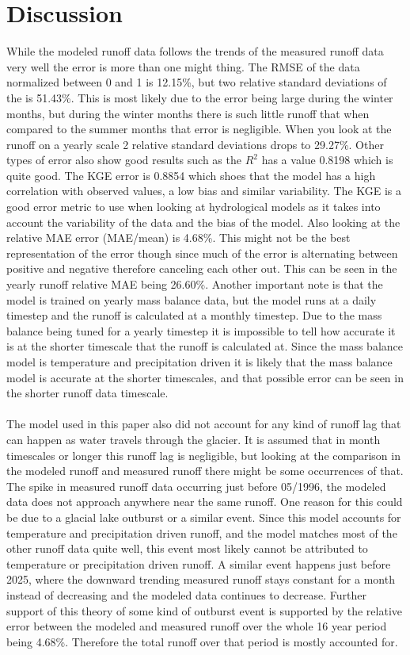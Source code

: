 \documentclass{article}
\begin{document}
\section{Discussion}
While the modeled runoff data follows the trends of the measured runoff data very well the error is more than one might thing. The RMSE of the 
data  normalized between 0 and 1 is 12.15\%, but two relative standard deviations of the is 51.43\%. This is most likely due to the error being 
large during the winter months, but during the winter months there is such little runoff that when compared to the summer months that error is 
negligible. When you look at the runoff on a yearly scale 2 relative standard deviations drops to 29.27\%. Other types of error also show good 
results such as the $R^2$ has a value 0.8198 which is quite good. The KGE error is 0.8854 which shoes that the model has a high correlation 
with observed values, a low bias and similar variability. The KGE is a good error metric to use when looking at hydrological models as it
takes into account the variability of the data and the bias of the model. Also looking at the relative MAE error (MAE/mean) is 4.68\%. This 
might not be the best representation of the error though since much of the error is alternating between positive and negative therefore 
canceling each other out. This can be seen in the yearly runoff relative MAE being 26.60\%. Another important note is that the model is trained 
on yearly mass balance data, but the model runs at a daily timestep and the runoff is calculated at a monthly timestep. Due to the mass 
balance being tuned for a yearly timestep it is impossible to tell how accurate it is at the shorter timescale that the runoff is calculated 
at. Since the mass balance model is temperature and precipitation driven it is likely that the mass balance model is accurate at the shorter 
timescales, and that possible error can be seen in the shorter runoff data timescale.
\paragraph{}
The model used in this paper also did not account for any kind of runoff lag that can happen as water travels through the glacier. It is 
assumed that in month timescales or longer this runoff lag is negligible, but looking at the comparison in the modeled runoff and measured 
runoff there might be some occurrences of that. The spike in measured runoff data occurring just before 05/1996, the modeled data does not 
approach anywhere near the same runoff. One reason for this could be due to a glacial lake outburst or a similar event. Since this model 
accounts for temperature and precipitation driven runoff, and the model matches most of the other runoff data quite well, this event most 
likely cannot be attributed to temperature or precipitation driven runoff. A similar event happens just before 2025, where the downward 
trending measured runoff stays constant for a month instead of decreasing and the modeled data continues to decrease. Further support of 
this theory of some kind of outburst event is supported by the relative error between the modeled and measured runoff over the whole 16 year 
period being 4.68\%. Therefore the total runoff over that period is mostly accounted for. 
\end{document}
